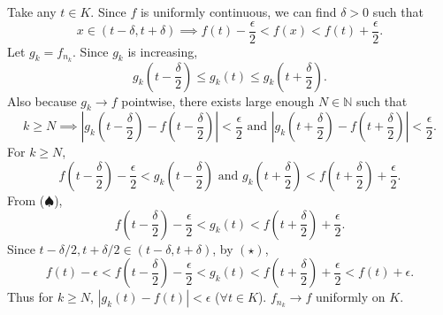 \documentclass[12pt]{report}
\newcommand{\abs}[1]{\left| #1 \right|}
\newcommand{\ra}{\rightarrow}
\newcommand{\N}{\mathbb{N}}
\begin{document}
\begin{enumerate}
    Take any \(t \in K\). Since \(f\) is uniformly continuous, we can find \(\delta > 0\) such that
    \[ \tag{\(\star\)}
        x \in (t - \delta, t + \delta) \implies f(t) - \frac{\epsilon}{2} < f(x) < f(t) + \frac{\epsilon}{2}.
    \]
    Let \(g_k = f_{n_k}\). Since \(g_k\) is increasing,
    \[ \tag{\(\spadesuit\)}
        g_k\left(t - \frac{\delta}{2}\right) \leq g_k(t) \leq g_k\left(t + \frac{\delta}{2}\right).
    \]
    Also because \(g_k \ra f\) pointwise, there exists large enough \(N \in \N\) such that
    \[
        k \geq N \implies \abs{g_k\left(t - \frac{\delta}{2}\right) - f\left(t - \frac{\delta}{2}\right)} < \frac{\epsilon}{2} \text{ and } \abs{g_k\left(t + \frac{\delta}{2}\right) - f\left(t + \frac{\delta}{2}\right)} < \frac{\epsilon}{2}.
    \]
    For \(k \geq N\),
    \[
        f\left(t - \frac{\delta}{2}\right) - \frac{\epsilon}{2} < g_k\left(t - \frac{\delta}{2}\right) \text{ and } g_k\left(t + \frac{\delta}{2}\right) < f\left(t + \frac{\delta}{2}\right) + \frac{\epsilon}{2}.
    \]
    From (\(\spadesuit\)),
    \[
        f\left(t - \frac{\delta}{2}\right) - \frac{\epsilon}{2} < g_k(t) < f\left(t +\frac{\delta}{2}\right) + \frac{\epsilon}{2}.
    \]
    Since \(t - \delta / 2, t + \delta/2 \in (t-\delta, t+\delta)\), by \((\star)\),
    \[
        f(t) - \epsilon < f\left(t - \frac{\delta}{2}\right) - \frac{\epsilon}{2} < g_k(t) < f\left(t + \frac{\delta}{2}\right) + \frac{\epsilon}{2} < f(t) + \epsilon.
    \]
    Thus for \(k \geq N\), \(\abs{g_k(t) - f(t)} < \epsilon\) (\(\forall t \in K\)). \(f_{n_k} \ra f\) uniformly on \(K\).

    \pagebreak


\end{enumerate}
\end{document}
